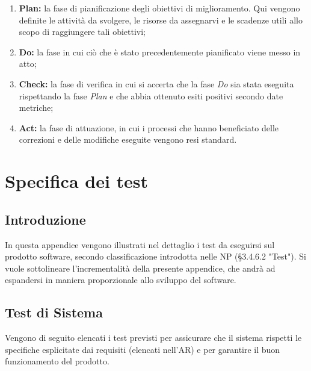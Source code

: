 \documentclass[openany,12pt,a4paper]{report}
\begin{document}
\begin{enumerate}
    \item \textbf{Plan:} la fase di pianificazione degli obiettivi di miglioramento. Qui vengono definite le attività da svolgere, le risorse da assegnarvi e le scadenze utili allo scopo di raggiungere tali obiettivi;
    \item \textbf{Do:} la fase in cui ciò che è stato precedentemente pianificato viene messo in atto;
    \item \textbf{Check:} la fase di verifica in cui si accerta che la fase \textit{Do} sia stata eseguita rispettando la fase \textit{Plan} e che abbia ottenuto esiti positivi secondo date metriche;
    \item \textbf{Act:} la fase di attuazione, in cui i processi che hanno beneficiato delle correzioni e delle modifiche eseguite vengono resi standard.
\end{enumerate}


\chapter{Specifica dei test}

\section{Introduzione}

In questa appendice vengono illustrati nel dettaglio i test da eseguirsi sul prodotto software, secondo classificazione introdotta nelle NP (§3.4.6.2 "Test"). Si vuole sottolineare l'incrementalità della presente appendice, che andrà ad espandersi in maniera proporzionale allo sviluppo del software.

\section{Test di Sistema}

Vengono di seguito elencati i test previsti per assicurare che il sistema rispetti le specifiche esplicitate dai requisiti (elencati nell'AR) e per garantire il buon funzionamento del prodotto.
\end{document}
